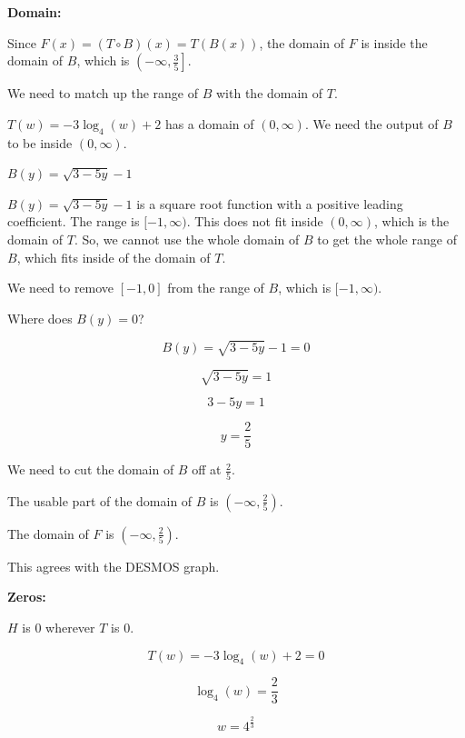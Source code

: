 \documentclass{ximera}
\begin{document}
\textbf{\textcolor{blue!55!black}{Domain:}} 



Since $F(x) = (T \circ B)(x) = T(B(x))$, the domain of $F$ is inside the domain of $B$, which is $\left(-\infty, \frac{3}{5} \right]$. 

We need to match up the range of $B$ with the domain of $T$. 


$T(w) = -3 \log_4(w) + 2$ has a domain of $(0, \infty)$.  We need the output of $B$ to be inside $(0, \infty)$. 



$B(y) = \sqrt{3 - 5y} - 1$ 



$B(y) = \sqrt{3 - 5y} - 1$ is a square root function with a positive leading coefficient.  The range is $[-1, \infty)$.   This does not fit inside $(0, \infty)$, which is the domain of $T$.  So, we cannot use the whole domain of $B$ to get the whole range of $B$, which fits inside of the domain of $T$. 


We need to remove $[-1, 0]$ from the range of $B$, which is $[-1, \infty)$. 


Where does $B(y) = 0$? 


\[
B(y) = \sqrt{3 - 5y} - 1 = 0
\]


\[
\sqrt{3 - 5y} = 1
\]


\[
3 - 5y = 1
\]

\[
y = \frac{2}{5}
\]

We need to cut the domain of $B$ off at $\frac{2}{5}$. 


The usable part of the domain of $B$ is  $\left(-\infty, \frac{2}{5} \right)$. 


The domain of $F$ is $\left(-\infty, \frac{2}{5} \right)$. 


This agrees with the DESMOS graph. 













\textbf{\textcolor{blue!55!black}{Zeros:}} 



$H$ is $0$ wherever $T$ is $0$.






\[
T(w) = -3 \log_4(w) + 2 = 0
\]


\[
 \log_4(w) = \frac{2}{3}
\]


\[
w = 4^{\tfrac{2}{3}}
\]
\end{document}
